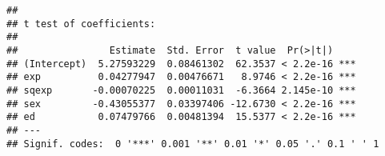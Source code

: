 \documentclass[
  12pt,
]{article}
\begin{document}
\begin{verbatim}
## 
## t test of coefficients:
## 
##                Estimate  Std. Error  t value  Pr(>|t|)    
## (Intercept)  5.27593229  0.08461302  62.3537 < 2.2e-16 ***
## exp          0.04277947  0.00476671   8.9746 < 2.2e-16 ***
## sqexp       -0.00070225  0.00011031  -6.3664 2.145e-10 ***
## sex         -0.43055377  0.03397406 -12.6730 < 2.2e-16 ***
## ed           0.07479766  0.00481394  15.5377 < 2.2e-16 ***
## ---
## Signif. codes:  0 '***' 0.001 '**' 0.01 '*' 0.05 '.' 0.1 ' ' 1
\end{verbatim}
\end{document}
